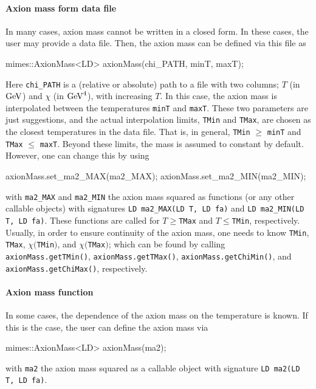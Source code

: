 \documentclass[11pt,a4paper]{article}
\begin{document}
\paragraph{Axion mass form data file} 
In many cases, axion mass cannot be written in a closed form. In these cases, the user may provide a data file. Then, the axion mass can be defined via this file as
%
\begin{cpp}
	mimes::AxionMass<LD> axionMass(chi_PATH, minT, maxT);
\end{cpp}
%
Here {\tt chi\_PATH} is a (relative or absolute) path to a file with two columns; $T$ (in ${\rm GeV}$) and $\chi$ (in ${\rm GeV}^4$), with increasing $T$. In this case, the axion mass is interpolated between the temperatures {\tt minT} and {\tt maxT}. These two parameters are just suggestions, and the actual interpolation limits, {\tt  TMin} and {\tt TMax}, are chosen as the closest temperatures in the data file. That is, in general, {\tt TMin} $\geq$ {\tt minT} and {\tt TMax} $\leq$ {\tt maxT}. Beyond these limits, the mass is assumed to constant by default. However, one can change this by using 
%
\begin{cpp}
	axionMass.set_ma2_MAX(ma2_MAX);
	axionMass.set_ma2_MIN(ma2_MIN);
\end{cpp}
%
with {\tt ma2\_MAX} and {\tt ma2\_MIN} the axion mass squared as functions (or any other callable objects) with signatures {\tt LD ma2\_MAX(LD T, LD fa)} and {\tt LD ma2\_MIN(LD T, LD fa)}. These functions are called for $T\geq${\tt TMax} and $T\leq${\tt TMin}, respectively. Usually, in order to ensure continuity of the axion mass, one needs to know {\tt TMin}, {\tt TMax}, $\chi(${\tt TMin}$)$, and $\chi(${\tt TMax}$)$; which can be found by calling {\tt axionMass.getTMin()}, {\tt axionMass.getTMax()}, {\tt axionMass.getChiMin()}, and {\tt axionMass.getChiMax()}, respectively.

\paragraph{Axion mass function} 
In some cases, the dependence of the axion mass on the temperature is known. If this is the case, the user can define the axion mass via 
%
\begin{cpp}
	mimes::AxionMass<LD> axionMass(ma2);
\end{cpp}
%
with {\tt ma2} the axion mass squared as a callable object with signature {\tt LD ma2(LD T, LD fa)}.
\end{document}
